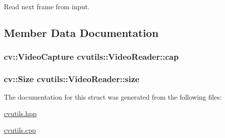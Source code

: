 Read next frame from input. 



\subsection{Member Data Documentation}
\hypertarget{structcvutils_1_1_video_reader_ae6b07273677636bf2144734c761153a6}{
\subsubsection[{cap}]{\setlength{\rightskip}{0pt plus 5cm}cv\-::\-Video\-Capture {\bf cvutils\-::\-Video\-Reader\-::cap}}}\label{structcvutils_1_1_video_reader_ae6b07273677636bf2144734c761153a6}
\hypertarget{structcvutils_1_1_video_reader_ac26957b49d881cb0dc896f076f4892a5}{
\subsubsection[{size}]{\setlength{\rightskip}{0pt plus 5cm}cv\-::\-Size {\bf cvutils\-::\-Video\-Reader\-::size}}}\label{structcvutils_1_1_video_reader_ac26957b49d881cb0dc896f076f4892a5}


The documentation for this struct was generated from the following files\-:\begin{DoxyCompactItemize}
\item 
\hyperlink{cvutils_8hpp}{cvutils.\-hpp}\item 
\hyperlink{cvutils_8cpp}{cvutils.\-cpp}\end{DoxyCompactItemize}
